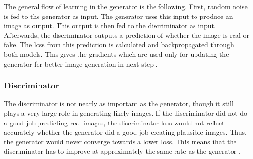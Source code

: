 \documentclass[12pt, fleqn, titlepage]{article}
\begin{document}
The general flow of learning in the generator is the following. First, random noise is fed to the generator as input. The generator uses this input to produce an image as output. This output is then fed to the discriminator as input. Afterwards, the discriminator outputs a prediction of whether the image is real or fake. The loss from this prediction is calculated and backpropagated through both models. This gives the gradients which are used only for updating the generator for better image generation in next step \cite{developers.google_generator}.

\subsubsection{Discriminator}
The discriminator is not nearly as important as the generator, though it still plays a very large role in generating likely images. If the discriminator did not do a good job predicting real images, the discriminator loss would not reflect accurately whether the generator did a good job creating plausible images. Thus, the generator would never converge towards a lower loss. This means that the discriminator has to improve at approximately the same rate as the generator \cite{developers.google_discriminator, developers.google_training}.
\end{document}
